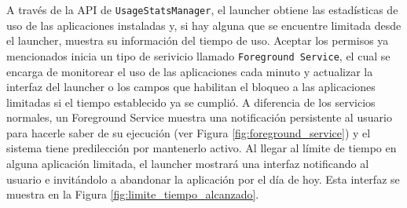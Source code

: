 A través de la API de \texttt{UsageStatsManager}, el launcher obtiene las estadísticas de uso de las aplicaciones instaladas y, si hay alguna que se encuentre limitada desde el launcher, muestra su información del tiempo de uso. Aceptar los permisos ya mencionados inicia un tipo de serivicio llamado \texttt{Foreground Service}, el cual se encarga de monitorear el uso de las aplicaciones cada minuto y actualizar la interfaz del launcher o los campos que habilitan el bloqueo a las aplicaciones limitadas si el tiempo establecido ya se cumplió. A diferencia de los servicios normales, un Foreground Service muestra una notificación persistente al usuario para hacerle saber de su ejecución (ver Figura \ref{fig:foreground_service}) y el sistema tiene predilección por mantenerlo activo. Al llegar al límite de tiempo en alguna aplicación limitada, el launcher mostrará una interfaz notificando al usuario e invitándolo a abandonar la aplicación por el día de hoy. Esta interfaz se muestra en la Figura \ref{fig:limite_tiempo_alcanzado}.

